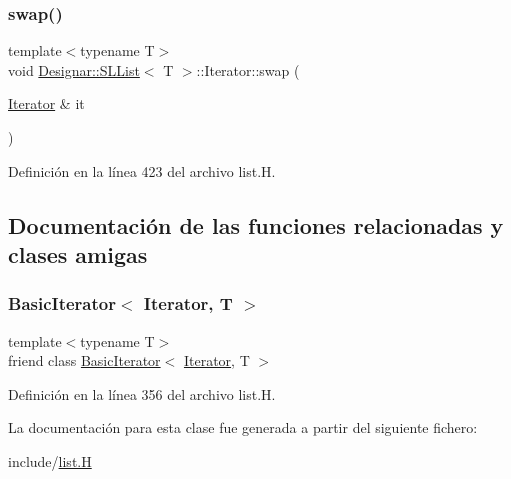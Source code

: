 \mbox{\label{class_designar_1_1_s_l_list_1_1_iterator_afbb40762fe2a3c8ecea8fb26751492e0}} 
\subsubsection{\texorpdfstring{swap()}{swap()}}
{\footnotesize\ttfamily template$<$typename T$>$ \\
void \hyperlink{class_designar_1_1_s_l_list}{Designar\+::\+S\+L\+List}$<$ T $>$\+::Iterator\+::swap (\begin{DoxyParamCaption}\item[{\hyperlink{class_designar_1_1_s_l_list_1_1_iterator}{Iterator} \&}]{it }\end{DoxyParamCaption})\hspace{0.3cm}{\ttfamily [inline]}}



Definición en la línea 423 del archivo list.\+H.



\subsection{Documentación de las funciones relacionadas y clases amigas}
\mbox{\label{class_designar_1_1_s_l_list_1_1_iterator_ae3421d6be56b523bf3c41ceb29f3e5d7}} 
\subsubsection{\texorpdfstring{Basic\+Iterator$<$ Iterator, T $>$}{BasicIterator< Iterator, T >}}
{\footnotesize\ttfamily template$<$typename T$>$ \\
friend class \hyperlink{class_designar_1_1_basic_iterator}{Basic\+Iterator}$<$ \hyperlink{class_designar_1_1_s_l_list_1_1_iterator}{Iterator}, T $>$\hspace{0.3cm}{\ttfamily [friend]}}



Definición en la línea 356 del archivo list.\+H.



La documentación para esta clase fue generada a partir del siguiente fichero\+:\begin{DoxyCompactItemize}
\item 
include/\hyperlink{list_8_h}{list.\+H}\end{DoxyCompactItemize}

